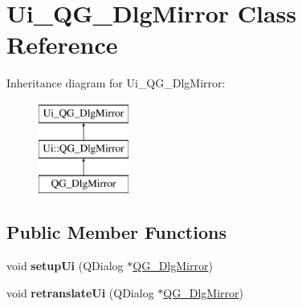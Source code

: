 \hypertarget{classUi__QG__DlgMirror}{\section{Ui\-\_\-\-Q\-G\-\_\-\-Dlg\-Mirror Class Reference}
\label{classUi__QG__DlgMirror}
}
Inheritance diagram for Ui\-\_\-\-Q\-G\-\_\-\-Dlg\-Mirror\-:\begin{figure}[H]
\begin{center}
\leavevmode
\includegraphics[height=3.000000cm]{classUi__QG__DlgMirror}
\end{center}
\end{figure}
\subsection*{Public Member Functions}
\begin{DoxyCompactItemize}
\item 
\hypertarget{classUi__QG__DlgMirror_aecdb8a7081fa88f8a79ccd614032cf09}{void {\bfseries setup\-Ui} (Q\-Dialog $\ast$\hyperlink{classQG__DlgMirror}{Q\-G\-\_\-\-Dlg\-Mirror})}\label{classUi__QG__DlgMirror_aecdb8a7081fa88f8a79ccd614032cf09}

\item 
\hypertarget{classUi__QG__DlgMirror_a1fe26d1355a7cb13dcd44ca9085e069b}{void {\bfseries retranslate\-Ui} (Q\-Dialog $\ast$\hyperlink{classQG__DlgMirror}{Q\-G\-\_\-\-Dlg\-Mirror})}\label{classUi__QG__DlgMirror_a1fe26d1355a7cb13dcd44ca9085e069b}

\end{DoxyCompactItemize}
